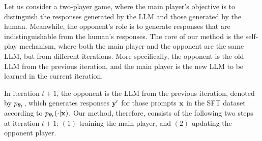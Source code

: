 \documentclass{article}
\begin{document}
Let us consider a two-player game, where the main player's objective is to distinguish the responses generated by the LLM and those generated by the human. Meanwhile, the opponent's role is to generate responses that are indistinguishable from the human's responses. The core of our method is the self-play mechanism, where both the main player and the opponent are the same LLM, but from different iterations. More specifically, the opponent is the old LLM from the previous iteration, and the main player is the new LLM to be learned in the current iteration.

In iteration $t+1$, the opponent is the LLM from the previous iteration, denoted by $p_{\bm{\theta}_t}$, which generates responses $\mathbf{y}'$ for those prompts $\mathbf{x}$ in the SFT dataset according to $p_{\bm{\theta}_t}(\cdot|\mathbf{x})$. Our method, therefore, consists of the following two steps at iteration $t+1$: $(1)$ training the main player, and $(2)$ updating the opponent player. 
\end{document}
